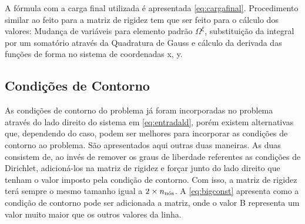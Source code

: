 A fórmula com a carga final utilizada é apresentada \eqref{eq:cargafinal}. Procedimento similar ao feito para a matriz de rigidez tem que ser feito para o cálculo dos valores: Mudança de variáveis para elemento padrão $\Omega^\xi$, substituição da integral por um somatório através da Quadratura de Gauss e cálculo da derivada das funções de forma no sistema de coordenadas x, y.


\subsection{Condições de Contorno}

As condições de contorno do problema já foram incorporadas no problema através do lado direito do sistema em \eqref{eq:entradald}, porém existem alternativas que, dependendo do caso, podem ser melhores para incorporar as condições de contorno ao problema. São apresentados aqui outras duas maneiras. As duas consistem de, ao invés de remover os graus de liberdade referentes as condições de Dirichlet,  adicioná-los na matriz de rigidez e forçar junto do lado direito que tenham o valor imposto pela condição de contorno. Com isso, a matriz de rigidez terá sempre o mesmo tamanho igual a $2\times \qtdnos$. A  \eqref{eq:bigconst} apresenta como a condição de contorno pode ser adicionada a matriz, onde o valor B representa um valor muito maior que os outros valores da linha.

